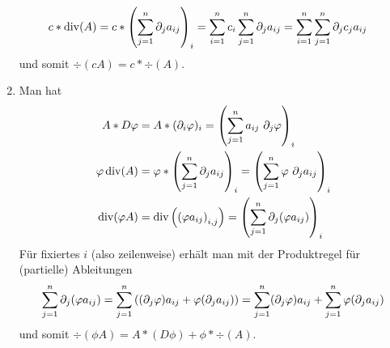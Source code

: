 \begin{exercisePage}
\begin{enumerate}[label=(zu \alph*), leftmargin=*]
\begin{align*}
			c * \operatorname{div}(A) &= c * \left( \sum_{j=1}^n \partial_j a_{ij} \right)_i = \sum_{i=1}^n c_i \sum_{j=1}^n \partial_j a_{ij} = \sum_{i=1}^n \sum_{j=1}^n \partial_j c_j a_{ij}
		\end{align*}
		und somit $\div(cA) = c * \div(A)$.
		\item Man hat
		\begin{align*}
			A * D\varphi &= A * (\partial_i \varphi)_i = \left( \sum_{j=1}^n a_{ij} \ \partial_j \varphi \right)_i \\
			\varphi \operatorname{div}(A) &= \varphi * \left( \sum_{j=1}^n \partial_j a_{ij} \right)_i = \left( \sum_{j=1}^n \varphi \ \partial_j a_{ij} \right)_i \\
			\operatorname{div}(\varphi A) &= \operatorname{div}\left( \left( \varphi a_{ij} \right)_{i,j} \right) = \left( \sum_{j=1}^n \partial_j (\varphi a_{ij}) \right)_i
		\end{align*}
		Für fixiertes $i$ (also zeilenweise) erhält man mit der Produktregel für (partielle) Ableitungen
		\begin{equation*}
			\sum_{j=1}^n \partial_j (\varphi a_{ij}) = \sum_{j=1}^n \left( (\partial_j \varphi) a_{ij} + \varphi (\partial_j a_{ij}) \right) = \sum_{j=1}^n (\partial_j \varphi) a_{ij} + \sum_{j=1}^n \varphi (\partial_j a_{ij})
		\end{equation*}
		und somit $\div(\phi A) = A * (D\phi) + \phi * \div(A)$.
	\end{enumerate}


\end{exercisePage}
